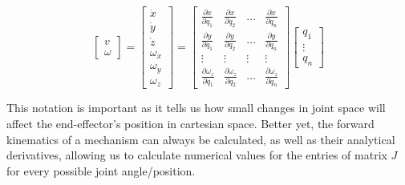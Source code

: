 \begin{equation}
\left[\begin{array}{c}v\\\omega\end{array}\right]=
\left[\begin{array}{c}\dot{x}\\
\dot{y}\\
\dot{z}\\
\omega_x\\
\omega_y\\
\omega_z\end{array}\right]=
\left[\begin{array}{cccc}\frac{\partial{x}}{\partial{q_1}} & \frac{\partial{x}}{\partial{q_2}} & \ldots & \frac{\partial{x}}{\partial{q_n}}\\\frac{\partial{y}}{\partial{q_1}} & \frac{\partial{y}}{\partial{q_2}} & \ldots & \frac{\partial{y}}{\partial{q_n}}\\\vdots & \vdots & \vdots & \vdots\\\frac{\partial{\omega_z}}{\partial{q_1}} & \frac{\partial{\omega_z}}{\partial{q_2}} & \ldots & \frac{\partial{\omega_z}}{\partial{q_n}}\end{array}\right]\left[\begin{array}{c}q_1\\\vdots\\q_n\end{array}\right]
\end{equation}

This notation is important as it tells us how small changes in joint space will affect the end-effector's position in cartesian space. Better yet, the forward kinematics of a mechanism can always be calculated, as well as their analytical derivatives, allowing us to calculate numerical values for the entries of matrix $J$ for every possible joint angle/position.

